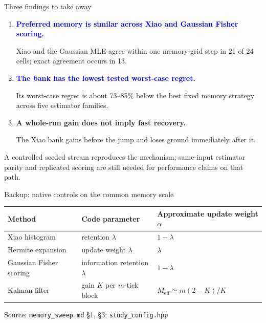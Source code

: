 \documentclass[aspectratio=169,11pt]{beamer}
\newcommand{\mem}{M_{\mathrm{eff}}}
\newcommand{\good}[1]{\textcolor{blue}{\textbf{#1}}}
\newcommand{\caution}[1]{\textcolor{rust}{\textbf{#1}}}
\newcommand{\src}[1]{\vfill{\tiny\color{gray}Source: #1}}
\begin{document}
\begin{frame}{Three findings to take away}
  \begin{enumerate}
    \item \good{Preferred memory is similar across Xiao and Gaussian Fisher scoring.}\par\smallskip
      Xiao and the Gaussian MLE agree within one memory-grid step in 21 of 24 cells;
      exact agreement occurs in 13.
    \medskip
    \item \good{The bank has the lowest tested worst-case regret.}\par\smallskip
      Its worst-case regret is about 73--85\% below the best fixed memory
      strategy across five estimator families.
    \medskip
    \item \caution{A whole-run gain does not imply fast recovery.}\par\smallskip
      The Xiao bank gains before the jump and loses ground immediately after it.
  \end{enumerate}
  \medskip
  \small A controlled seeded stream reproduces the mechanism; same-input estimator
  parity and replicated scoring are still needed for performance claims on that path.
\end{frame}



\appendix
\begin{frame}{Backup: native controls on the common memory scale}
  \begin{center}
  \begin{tabular}{lll}
    \toprule
    Method & Code parameter & Approximate update weight $\alpha$\\
    \midrule
    Xiao histogram & retention $\lambda$ & $1-\lambda$\\
    Hermite expansion & update weight $\lambda$ & $\lambda$\\
    Gaussian Fisher scoring & information retention $\lambda$ & $1-\lambda$\\
    Kalman filter & gain $K$ per $m$-tick block & $\mem\simeq m(2-K)/K$\\
    \bottomrule
  \end{tabular}
  \end{center}
  \src{\texttt{memory\_sweep.md} \S1, \S3; \texttt{study\_config.hpp}}
\end{frame}
\end{document}

